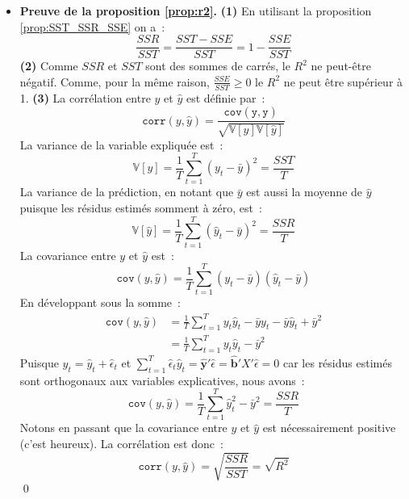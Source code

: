 \documentclass[10pt]{beamer}
\theoremstyle{plain}
\begin{document}
\begin{notes}
  \begin{itemize}
  \item \textbf{Preuve de la proposition \ref{prop:r2}.} \textbf{(1)} En utilisant la proposition \ref{prop:SST_SSR_SSE} on a~:
    \[
      \frac{SSR}{SST} = \frac{SST-SSE}{SST} = 1 - \frac{SSE}{SST}
    \]
    \textbf{(2)} Comme $SSR$ et $SST$ sont des sommes de carrés, le $R^2$ ne peut-être négatif. Comme, pour la même raison, $\frac{SSE}{SST}\geq 0$ le $R^2$ ne peut être supérieur à 1. \textbf{(3)} La corrélation entre $y$ et $\hat y$ est définie par~:
    \[
      \mathtt{corr}(y,\hat y) = \frac{\mathtt{cov(y,\hat y)}}{\sqrt{\mathbb V[y]\mathbb V[\hat y]}}
    \]
    La variance de la variable expliquée est~:
    \[
      \mathbb V [y] = \frac{1}{T}\sum_{t=1}^T(y_t-\bar y)^2 = \frac{SST}{T}
    \]
    La variance de la prédiction, en notant que $\bar y$ est aussi la moyenne de $\hat y$ puisque les résidus estimés somment à zéro, est~:
    \[
      \mathbb V [\hat y] = \frac{1}{T}\sum_{t=1}^T(\hat y_t-\bar y)^2 = \frac{SSR}{T}
    \]
    La covariance entre $y$ et $\hat y$ est~:
    \[
      \mathtt{cov}(y,\hat y) = \frac{1}{T}\sum_{t=1}^T(y_t-\bar y)(\hat y_t- \bar y)
    \]
    En développant sous la somme~:
    \[
      \begin{split}
        \mathtt{cov}(y,\hat y) &= \frac{1}{T}\sum_{t=1}^T y_t\hat y_t - \bar y y_t - \bar y \hat y_t + \bar y^2\\
                               &= \frac{1}{T}\sum_{t=1}^T y_t\hat y_t - \bar y^2
      \end{split}
    \]
    Puisque $y_t = \hat y_t + \hat \epsilon_t$ et $\sum_{t=1}^T\hat \epsilon_t \hat y_t  = \hat{\mathbf y}'\hat\epsilon = \hat{\mathbf b}'X'\hat\epsilon = 0$ car les résidus estimés sont orthogonaux aux variables explicatives, nous avons~:
    \[
      \mathtt{cov}(y,\hat y) = \frac{1}{T}\sum_{t=1}^T\hat y_t^2 - \bar y^2 = \frac{SSR}{T}
    \]
    Notons en passant que la covariance entre $y$ et $\hat y$ est nécessairement positive (c'est heureux). La corrélation est donc~:
    \[
      \mathtt{corr}(y,\hat y) = \sqrt{\frac{SSR}{SST}} = \sqrt{R^2}
    \]
    \qed\newline
  \end{itemize}
\end{notes}
\end{document}
